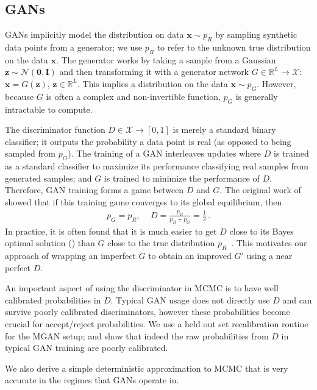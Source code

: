 \documentclass{article}
\renewcommand{\vec}[1]{{\boldsymbol{\mathbf{#1}}}} %
\newcommand{\mat}[1]{{\ensuremath{\mathbf{#1}}}} %
\newcommand{\R}{\mathbb{R}}
\newcommand{\set}[1]{\mathcal{#1}}
\newcommand{\sample}{\sim}
\newcommand{\norm}{\mathcal{N}}
\newcommand{\PG}{{p_G}}
\newcommand{\PR}{{p_R}}
\newcommand{\setx}{\set{X}}
\begin{document}
\subsection{GANs}
\label{sec:GANs}

GANs implicitly model the distribution on data $\vec x \sample \PR$ by sampling synthetic data points from a generator; we use $\PR$ to refer to the unknown true distribution on the data $\vec x$.
The generator works by taking a sample from a Gaussian $\vec z \sample \norm(\vec 0,\mat I)$ and then transforming it with a generator network $G \in \R^L \rightarrow \setx$: $\vec x = G(\vec z)$, $\vec z \in \R^L$.
This implies a distribution on the data $\vec x \sample \PG$.
However, because $G$ is often a complex and non-invertible function, $\PG$ is generally intractable to compute.

The discriminator function $D \in \setx \rightarrow [0,1]$ is merely a standard binary classifier; it outputs the probability a data point is real (as opposed to being sampled from $\PG$)\@.
The training of a GAN interleaves updates where $D$ is trained as a standard classifier to maximize its performance classifying real samples from generated samples; and $G$ is trained to minimize the performance of $D$.
Therefore, GAN training forms a game between $D$ and $G$.
The original work of~\citet{Goodfellow2014} showed that if this training game converges to its global equilibrium, then
\begin{align}
  \PG = \PR,\, \quad D = \frac{\PR}{\PR + \PG} = \frac{1}{2}\,.
\end{align}
In practice, it is often found that it is much easier to get $D$ close to its Bayes optimal solution (\smash{$\PR/(\PR + \PG)$}) than $G$ close to the true distribution $\PR$~\citep{Shibuya2017}.
This motivates our approach of wrapping an imperfect $G$ to obtain an improved $G'$ using a near perfect $D$.

An important aspect of using the discriminator in MCMC is to have well calibrated probabilities in $D$.
Typical GAN usage does not directly use $D$ and can survive poorly calibrated discriminators, however these probabilities become crucial for accept/reject probabilities.
We use a held out set recalibration routine for the MGAN setup; and show that indeed the raw probabilities from $D$ in typical GAN training are poorly calibrated.

We also derive a simple deterministic approximation to MCMC that is very accurate in the regimes that GANs operate in.
\end{document}
